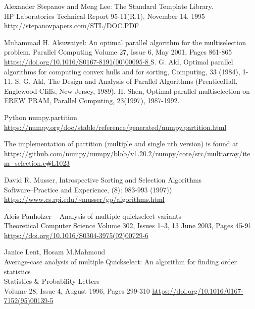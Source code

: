 \renewcommand{\addcontentsline}[3]{}%
\begin{thebibliography}{9}

Alexander Stepanov and Meng Lee: The Standard Template Library.\\HP Laboratories Technical Report 95-11(R.1), November 14, 1995 \\
\url{http://stepanovpapers.com/STL/DOC.PDF }

Muhammad H. Alsuwaiyel: An optimal parallel algorithm for the multiselection problem. 
Parallel Computing Volume 27, Issue 6, May 2001, Pages 861-865\\
\url{https://doi.org/10.1016/S0167-8191(00)00095-8 }
S. G. Akl, Optimal parallel algorithms for computing convex hulls and for sorting, Computing, 33 (1984), 1-11.
S. G. Akl, The Design and Analysis of Parallel Algorithms (PrenticeHall, Englewood Cliffs, New Jersey, 1989).
H. Shen, Optimal parallel multiselection on EREW PRAM, Parallel Computing, 23(1997), 1987-1992.

Python numpy.partition \\
\url{https://numpy.org/doc/stable/reference/generated/numpy.partition.html }

The implementation of partition (multiple and single nth version) is found at
{\footnotesize \url{https://github.com/numpy/numpy/blob/v1.20.2/numpy/core/src/multiarray/item_selection.c#L1023 }}

David R. Musser, Introspective Sorting and Selection Algorithms\\
Software--Practice and Experience, (8): 983-993 (1997))\\
\url{https://www.cs.rpi.edu/~musser/gp/algorithms.html }

Alois Panholzer --
Analysis of multiple quickselect variants\\
Theoretical Computer Science
Volume 302, Issues 1–3, 13 June 2003, Pages 45-91\\
\url{https://doi.org/10.1016/S0304-3975(02)00729-6 }

Janice Lent, Hosam M.Mahmoud\\
Average-case analysis of multiple Quickselect: An algorithm for finding order statistics\\
Statistics \& Probability Letters \\
Volume 28, Issue 4, August 1996, Pages 299-310
\url{https://doi.org/10.1016/0167-7152(95)00139-5}



\end{thebibliography}
